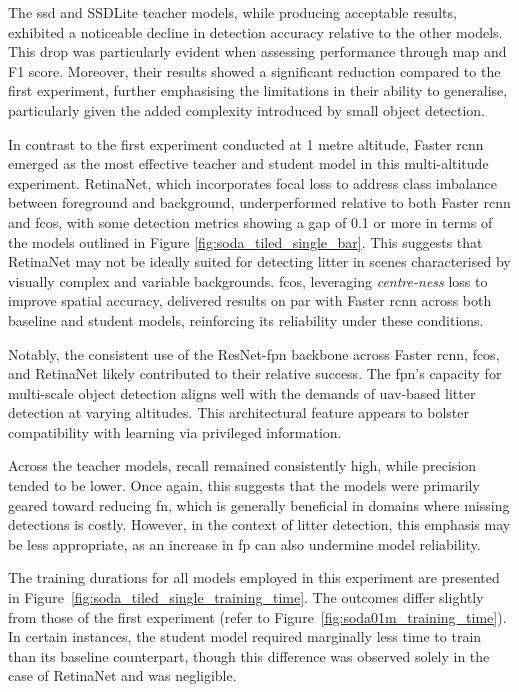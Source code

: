The \gls{ssd} and SSDLite teacher models, while producing acceptable results, exhibited a noticeable decline in detection accuracy relative to the other models. This drop was particularly evident when assessing performance through \gls{map} and F1 score. Moreover, their results showed a significant reduction compared to the first experiment, further emphasising the limitations in their ability to generalise, particularly given the added complexity introduced by small object detection.

In contrast to the first experiment conducted at 1 metre altitude, Faster \gls{rcnn} emerged as the most effective teacher and student model in this multi-altitude experiment. RetinaNet, which incorporates focal loss to address class imbalance between foreground and background, underperformed relative to both Faster \gls{rcnn} and \gls{fcos}, with some detection metrics showing a gap of 0.1 or more in terms of the models outlined in Figure \ref{fig:soda_tiled_single_bar}. This suggests that RetinaNet may not be ideally suited for detecting litter in scenes characterised by visually complex and variable backgrounds. \gls{fcos}, leveraging \textit{centre-ness} loss to improve spatial accuracy, delivered results on par with Faster \gls{rcnn} across both baseline and student models, reinforcing its reliability under these conditions.

Notably, the consistent use of the ResNet-\gls{fpn} backbone across Faster \gls{rcnn}, \gls{fcos}, and RetinaNet likely contributed to their relative success. The \gls{fpn}’s capacity for multi-scale object detection aligns well with the demands of \gls{uav}-based litter detection at varying altitudes. This architectural feature appears to bolster compatibility with learning via privileged information.

Across the teacher models, recall remained consistently high, while precision tended to be lower. Once again, this suggests that the models were primarily geared toward reducing \gls{fn}, which is generally beneficial in domains where missing detections is costly. However, in the context of litter detection, this emphasis may be less appropriate, as an increase in \gls{fp} can also undermine model reliability.

The training durations for all models employed in this experiment are presented in Figure~\ref{fig:soda_tiled_single_training_time}. The outcomes differ slightly from those of the first experiment (refer to Figure~\ref{fig:soda01m_training_time}). In certain instances, the student model required marginally less time to train than its baseline counterpart, though this difference was observed solely in the case of RetinaNet and was negligible.

